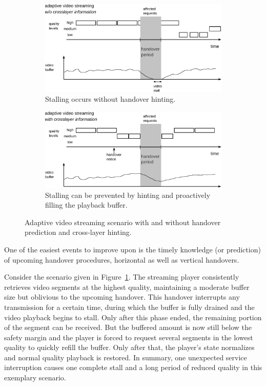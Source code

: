 \begin{figure}[htb]
	\centering
	\begin{subfigure}[b]{0.80\textwidth}
		\includegraphics[width=\textwidth]{images/adaptive-streaming-no-cl.pdf}
		\caption{Stalling occurs without handover hinting.}
		\label{c5:fig:streaming-hinting-no-cl}
	\end{subfigure}%

	\begin{subfigure}[b]{0.80\textwidth}
		\includegraphics[width=\textwidth]{images/adaptive-streaming-cl.pdf}
		\caption{Stalling can be prevented by hinting and proactively filling the playback buffer.}
		\label{c5:fig:streaming-hinting-cl}
	\end{subfigure}%
	\caption{Adaptive video streaming scenario with and without handover prediction and cross-layer hinting.}
\label{c5:fig:streaming-hinting}
\end{figure}

One of the easiest events to improve upon is the timely knowledge (or prediction) of upcoming handover procedures, horizontal as well as vertical handovers.

Consider the scenario given in Figure~\ref{c5:fig:streaming-hinting-no-cl}. The streaming player consistently retrieves video segments at the highest quality, maintaining a moderate buffer size but oblivious to the upcoming handover. This handover interrupts any transmission for a certain time, during which the buffer is fully drained and the video playback begins to stall. Only after this phase ended, the remaining portion of the segment can be received. But the buffered amount is now still below the safety margin and the player is forced to request several segments in the lowest quality to quickly refill the buffer. Only after that, the player's state normalizes and normal quality playback is restored. In summary, one unexpected service interruption causes one complete stall and a long period of reduced quality in this exemplary scenario.

